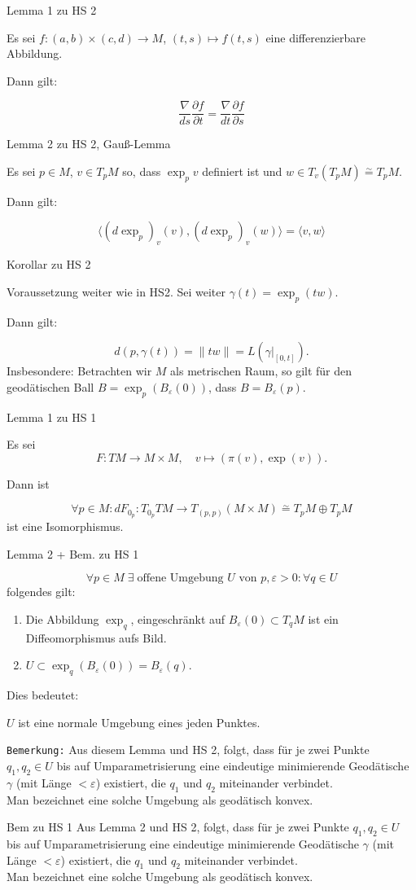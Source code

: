 \documentclass[a6paper,11pt,grid=front]{kartei}
\newcommand{\fl}[1]{\begin{flushleft}
 #1 \end{flushleft}}
\newcommand{\eps}{\varepsilon}
\newcounter{def}
\begin{document}
\nonameyet
{Lemma 1} {zu HS 2}
{
Es sei $f: (a,b) \times (c,d) \to M$, $(t,s) \mapsto f(t,s)$ eine 
differenzierbare Abbildung.
\fl{Dann gilt:}
\[
\frac{\nabla}{ds} \frac{\partial f}{\partial t} 
= \frac{\nabla}{dt} \frac{\partial f}{\partial s}
\]	
}
{}

\nonameyet
{Lemma 2} {\small zu HS 2, Gauß-Lemma}
{
Es sei $p\in M$, $v\in T_pM$ so, dass $\exp_p v$ definiert ist
und $w\in T_v (T_p M) \overset{\sim}{=} T_pM$. 

\fl{Dann gilt:}
\[
\langle (d \exp_p)_v (v), (d \exp_p)_v(w) \rangle
= \langle v, w \rangle 
\]
}
{}

\nonameyet
{Korollar} {zu HS 2}
{
Voraussetzung weiter wie in HS2. Sei weiter 
$\gamma(t) = \exp_p(tw)$.
\fl{Dann gilt:}
\[
d(p,\gamma(t)) = \| tw \| = L(\gamma|_{[0,t]}).
\]
Insbesondere: Betrachten wir $M$ als metrischen Raum, so gilt für den
geodätischen Ball $B = \exp_p(B_\eps (0))$, dass $B = B_\eps(p)$.
}
{}


\nonameyet
{Lemma 1} {zu HS 1}
{
Es sei 
\[
F: TM \to M \times M, \quad v \mapsto (\pi(v), \exp(v)).
\]
\fl{Dann ist}
\[
\forall p\in M : dF_{0_p}: T_{0_p}TM \to T_{(p,p)}(M \times M)
\overset{\sim}{=} T_pM \oplus T_pM
\]
ist eine Isomorphismus.
}
{}


\nonameyet
{Lemma 2 + Bem.} {zu HS 1}
{
\small
\[
\forall p \in M \; \exists \; \text{offene Umgebung $U$ von } p, \eps > 0: 
\forall q\in U
\]
folgendes gilt:
\begin{enumerate}[1.]
\item  Die Abbildung $\exp_q$, eingeschränkt auf $B_\eps(0) \subset T_qM$ 
ist ein Diffeomorphismus aufs Bild.
\item $U\subset \exp_q(B_\eps(0)) = B_\eps(q)$.
\end{enumerate}
%
\fl{Dies bedeutet:}
$U$ ist eine normale Umgebung eines jeden Punktes.
\fl{\texttt{Bemerkung:}
Aus diesem Lemma und HS 2, folgt, dass für je zwei Punkte $q_1, q_2 \in U$ 
bis auf Umparametrisierung eine eindeutige minimierende Geodätische 
$\gamma$ (mit Länge $< \eps$) existiert, die $q_1$ und $q_2$
miteinander verbindet.
\\
Man bezeichnet eine solche Umgebung als geodätisch konvex.}
}
{}

\nonameyet
{Bem} {zu HS 1}
{
Aus Lemma 2 und HS 2, folgt, dass für je zwei Punkte $q_1, q_2 \in U$ bis auf
Umparametrisierung eine eindeutige minimierende Geodätische $\gamma$ (mit 
Länge $< \eps$) existiert, die $q_1$ und $q_2$ miteinander verbindet.
\\
Man bezeichnet eine solche Umgebung als geodätisch konvex.
}
{}
\end{document}
